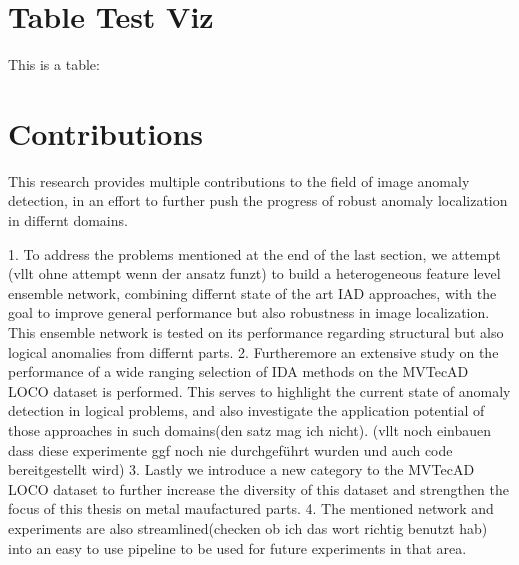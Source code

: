 \section{Table Test Viz}

This is a table:







\section{Contributions}
This research provides multiple contributions to the field of image anomaly detection, in an effort to further push the progress of 
robust anomaly localization in differnt domains. 

1. To address the problems mentioned at the end of the last section, we attempt (vllt ohne attempt wenn der ansatz funzt) 
to build a heterogeneous feature level ensemble network, combining differnt state of the art IAD approaches, with the goal to improve 
general performance but also robustness in image localization. This ensemble network is tested on its performance regarding structural 
but also logical anomalies from differnt parts. 
2. Furtheremore an extensive study on the performance of a wide ranging selection of IDA methods on the MVTecAD LOCO dataset is performed. 
This serves to highlight the current state of anomaly detection in logical problems, and also investigate the application potential of 
those approaches in such domains(den satz mag ich nicht). (vllt noch einbauen dass diese experimente ggf noch nie durchgeführt wurden und auch code bereitgestellt wird)
3. Lastly we introduce a new category to the MVTecAD LOCO dataset to further increase the diversity of this dataset and strengthen the focus 
of this thesis on metal maufactured parts.
4. The mentioned network and experiments are also streamlined(checken ob ich das wort richtig benutzt hab) into an easy to use pipeline 
to be used for future experiments in that area.

